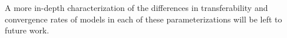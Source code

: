 \documentclass{article} %
\newcommand{\bb}[1]{{\color{red}[BB: #1]}}
\begin{document}
A more in-depth characterization of the differences in transferability and convergence rates of models in each of these parameterizations will be left to future work. 














\end{document}
